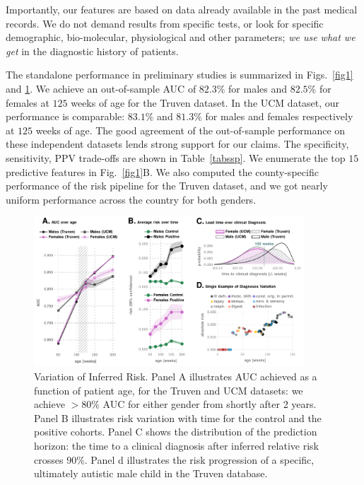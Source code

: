 \documentclass[onecolumn, compsoc,11pt]{IEEEtran}
\renewcommand{\captionN}[1]{\caption{\color{CadetBlue4!80!black} \sffamily \fontsize{9}{10}\selectfont #1  }}
\begin{document}
Importantly, our features are  based on data already  available in the past  medical records. We do not demand results from specific tests, or look for specific demographic, bio-molecular, physiological and other parameters; \textit{we use what we get} in the diagnostic history of patients.

\def\RCOL{\rowcolor{teal!40}}

The standalone performance in preliminary studies is summarized  in Figs.~\ref{fig1} and \ref{fig2}. 
We achieve an out-of-sample AUC of $82.3\%$ for males and $82.5\%$ for females at $125$ weeks of age for the Truven dataset. In the UCM dataset, our performance is comparable: $83.1\%$ and $81.3\%$ for males and females respectively at $125$ weeks of age. The good agreement of the out-of-sample performance on these independent datasets lends strong support for our claims. The specificity, sensitivity, PPV trade-offs are shown in Table~\ref{tabssp}. We enumerate the top $15$ predictive features in Fig.~\ref{fig1}B. 
We also computed the county-specific performance of the risk pipeline for the Truven dataset, and we got nearly uniform performance across the country for both genders. 
%
\begin{figure}[t]
  
  \centering 
   \includegraphics[width=0.9\textwidth]{Figures/test-figure0}
   \vspace{-15pt}

    \captionN{Variation of Inferred Risk. Panel A illustrates AUC achieved as a function of
      patient age, for the Truven and UCM datasets: we achieve $>80\%$ AUC for either gender from shortly after 2 years.   Panel B illustrates  risk variation with time for the control and the positive cohorts. Panel C shows the distribution of the prediction horizon: the time to a clinical diagnosis after inferred  relative risk crosses $90\%$. Panel d illustrates the risk progression of a specific, ultimately autistic male child in the Truven database. }\label{fig2}
       \vspace{-15pt}

\end{figure}
\end{document}
